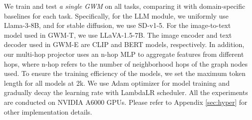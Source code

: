 \begin{table}[!tbp]
\setlength\tabcolsep{5pt} %
\centering
\begin{footnotesize}
\caption{\textbf{Traditional graph prediction results on Cora, PubMed, and HIV}. It covers representative tasks at the node-level, edge-level, and graph-level. Compared to classic graph baselines and GFM methods, our GWM can match their performance with one unified model.}%
\label{tab:Traditional graph prediction}
\end{footnotesize}
\end{table}  %




 We train and test \textit{a single GWM} on all tasks, comparing it with domain-specific baselines for each task. Specifically, for the LLM module, we uniformly use Llama-3-8B, and for stable diffusion, we use SD-v1-5. For the image-to-text model used in GWM-T, we use LLaVA-1.5-7B. The image encoder and text decoder used in GWM-E are CLIP and BERT models, respectively. In addition, our multi-hop projector uses an n-hop MLP to aggregate features from different hops, where n-hop refers to the number of neighborhood hops of the graph nodes used. To ensure the training efficiency of the models, we set the maximum token length for all models at 2k. We use Adam optimizer \citep{diederik2014adam} for model training and gradually decay the learning rate with LambdaLR scheduler. All the experiments are conducted on NVIDIA A6000 GPUs. Please refer to Appendix \ref{sec:hyper} for other implementation details.


